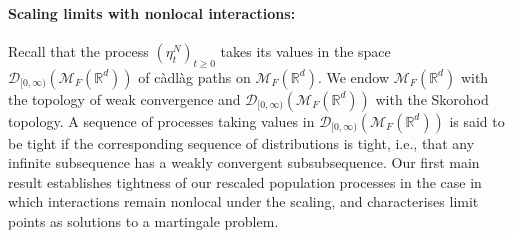 \documentclass[EJP]{ejpecp} %
\newcommand{\IR}{\mathbb R}
\newcommand{\measures}{\mathcal{M}_F(\IR^d)} %
\begin{document}
\paragraph{Scaling limits with nonlocal interactions:}
Recall that the process $(\eta_t^N)_{t\geq 0}$ takes its values in the space
${\mathcal D}_{[0,\infty)}(\measures)$ of c\`adl\`ag
paths on $\measures$. We endow $\measures$ with the topology of weak convergence
and 
${\mathcal D}_{[0,\infty)}(\measures)$ with the Skorohod topology.
A sequence of processes taking values in 
${\mathcal D}_{[0,\infty)}(\measures)$ is said to be tight if the corresponding
sequence of distributions is tight,
i.e., that any infinite subsequence has a weakly convergent subsubsequence.
Our first main result establishes tightness of our rescaled population processes in 
the case in which interactions remain nonlocal under the scaling, and 
characterises limit points as solutions to a martingale problem. 
\end{document}
